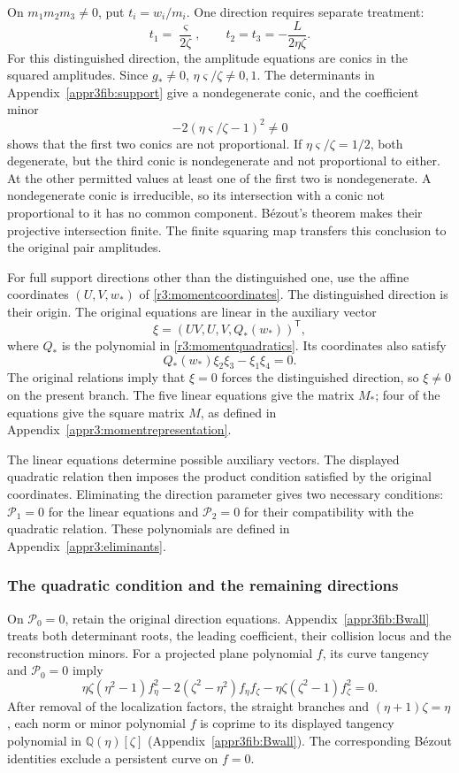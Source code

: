 \documentclass[11pt,a4paper]{article}
\numberwithin{equation}{section}
\theoremstyle{plain}
\theoremstyle{definition}
\theoremstyle{remark}
\begin{document}
On $m_1m_2m_3\ne0$, put $t_i=w_i/m_i$. One direction requires
separate treatment:
\[
 t_1=\frac{\varsigma}{2\zeta},\qquad
 t_2=t_3=-\frac{L}{2\eta\zeta}.
\]
For this distinguished direction, the amplitude equations are
conics in the squared amplitudes. Since $g_*\ne0$,
$\eta\varsigma/\zeta\ne0,1$. The determinants in
Appendix~\ref{appr3fib:support} give a nondegenerate conic, and the
coefficient minor
\[
 -2(\eta\varsigma/\zeta-1)^2\ne0
\]
shows that the first two conics are not proportional.
If $\eta\varsigma/\zeta=1/2$, both degenerate, but the third conic
is nondegenerate and not proportional to either. At the other
permitted values at least one of the first two is nondegenerate.
A nondegenerate conic is irreducible, so its intersection with
a conic not proportional to it has no common component.
B\'ezout's theorem makes their projective intersection finite.
The finite squaring map transfers this conclusion to the original
pair amplitudes.

For full support directions other than the distinguished one,
use the affine coordinates $(U,V,w_*)$ of
\eqref{r3:momentcoordinates}. The distinguished direction is their
origin. The original equations are linear in the auxiliary vector
\[
 \xi=(UV,U,V,Q_*(w_*))^{\mathsf T},
\]
where $Q_*$ is the polynomial in
\eqref{r3:momentquadratics}. Its coordinates also satisfy
\[
 Q_*(w_*)\xi_2\xi_3-\xi_1\xi_4=0.
\]
The original relations imply that $\xi=0$ forces the
distinguished direction, so $\xi\ne0$ on the present branch.
The five linear equations give the matrix $M_*$; four of the
equations give the square matrix $M$, as defined in
Appendix~\ref{appr3:momentrepresentation}.

The linear equations determine possible auxiliary vectors.
The displayed quadratic relation then imposes the product
condition satisfied by the original coordinates. Eliminating
the direction parameter gives two necessary conditions:
$\mathcal P_1=0$ for the linear equations and
$\mathcal P_2=0$ for their compatibility with the quadratic
relation. These polynomials are defined in
Appendix~\ref{appr3:eliminants}.

\subsubsection{The quadratic condition and the remaining directions}

On $\mathcal P_0=0$, retain the original direction equations.
Appendix~\ref{appr3fib:Bwall} treats both determinant roots,
the leading coefficient, their collision locus and the reconstruction
minors. For a projected plane polynomial $f$, its curve tangency and
$\mathcal P_0=0$ imply
\[
 \eta\zeta(\eta^2-1)f_\eta^2
 -2(\zeta^2-\eta^2)f_\eta f_\zeta
 -\eta\zeta(\zeta^2-1)f_\zeta^2=0.
\]
After removal of the localization factors, the straight branches
and $(\eta+1)\zeta=\eta$, each norm or minor polynomial $f$ is
coprime to its displayed tangency polynomial in
$\mathbb Q(\eta)[\zeta]$ (Appendix~\ref{appr3fib:Bwall}).
The corresponding B\'ezout identities exclude a persistent curve
on $f=0$.
\end{document}
